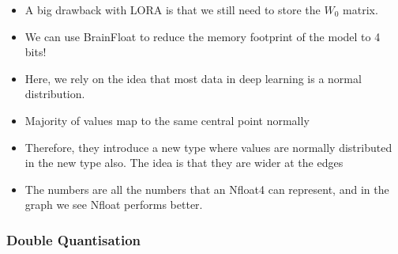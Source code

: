 \documentclass[11pt]{article}
\begin{document}
\begin{minipage}[l]{.5\linewidth}
    \begin{figure}[H]
        \centering
    \end{figure}    
\end{minipage}\hfill
\begin{minipage}[r]{.48\linewidth}
    \begin{itemize}
        \item A big drawback with LORA is that we still need to store the $W_0$ matrix.
        \item We can use BrainFloat to reduce the memory footprint of the model to 4 bits!
        \item Here, we rely on the idea that most data in deep learning is a normal distribution. 
        \item Majority of values map to the same central point normally
        \item Therefore, they introduce a new type where values are normally distributed in the new type also. The idea is that they are wider at the edges
        \item The numbers are all the numbers that an Nfloat4 can represent, and in the graph we see Nfloat performs better.
    \end{itemize}
\end{minipage}

\subsubsection{Double Quantisation}
\end{document}
